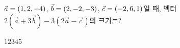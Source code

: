 $\vec{a}=(1{,}\mkern3mu\mathopen{}2{,}\mkern3mu\mathopen{}-4)$, $\vec{b}=(2{,}\mkern3mu\mathopen{}-2{,}\mkern3mu\mathopen{}-3)$, $\vec{c}=(-2{,}\mkern3mu\mathopen{}6{,}\mkern3mu\mathopen{}1)$일 때, 벡터 $2(\vec{a}+3\vec{b})-3(2\vec{a}-\vec{c})$의 크기는?
\begin{choices32}{$1$}{$2$}{$3$}{$4$}{$5$}\end{choices32}
